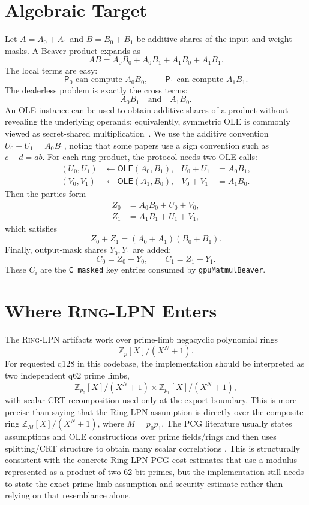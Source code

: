 \documentclass[11pt]{article}
\newcommand{\Z}{\mathbb{Z}}
\newcommand{\ServerZero}{\mathsf{P}_0}
\newcommand{\ServerOne}{\mathsf{P}_1}
\newcommand{\PrimeRing}{\Z_p[X]/(X^N+1)}
\newcommand{\LimbRing}[1]{\Z_{p_{#1}}[X]/(X^N+1)}
\newcommand{\CRTRing}{\LimbRing{0} \times \LimbRing{1}}
\newcommand{\RingLPN}{\textsc{Ring-LPN}}
\newcommand{\OLE}{\mathsf{OLE}}
\begin{document}
\section{Algebraic Target}

Let \(A=A_0+A_1\) and \(B=B_0+B_1\) be additive shares of the input and weight
masks. A Beaver product expands as
\[
  AB =
  A_0B_0 + A_0B_1 + A_1B_0 + A_1B_1 .
\]
The local terms are easy:
\[
  \ServerZero \text{ can compute } A_0B_0,\qquad
  \ServerOne \text{ can compute } A_1B_1.
\]
The dealerless problem is exactly the cross terms:
\[
  A_0B_1 \quad \text{and} \quad A_1B_0.
\]
An OLE instance can be used to obtain additive shares of a product without
revealing the underlying operands; equivalently, symmetric OLE is commonly
viewed as secret-shared multiplication~\cite{baum2020ole}. We use the additive
convention \(U_0+U_1=A_0B_1\), noting that some papers use a sign convention
such as \(c-d=ab\). For each ring product, the protocol needs two OLE calls:
\[
\begin{aligned}
  (U_0,U_1) &\leftarrow \OLE(A_0,B_1), &
  U_0+U_1 &= A_0B_1,\\
  (V_0,V_1) &\leftarrow \OLE(A_1,B_0), &
  V_0+V_1 &= A_1B_0.
\end{aligned}
\]
Then the parties form
\[
\begin{aligned}
  Z_0 &= A_0B_0 + U_0 + V_0,\\
  Z_1 &= A_1B_1 + U_1 + V_1,
\end{aligned}
\]
which satisfies
\[
  Z_0+Z_1 = (A_0+A_1)(B_0+B_1).
\]
Finally, output-mask shares \(Y_0,Y_1\) are added:
\[
  C_0 = Z_0 + Y_0,\qquad C_1 = Z_1 + Y_1.
\]
These \(C_i\) are the \texttt{C\_masked} key entries consumed by
\texttt{gpuMatmulBeaver}.

\section{Where \RingLPN{} Enters}

The \RingLPN{} artifacts work over prime-limb negacyclic polynomial rings
\[
  \PrimeRing .
\]
For requested q128 in this codebase, the implementation should be interpreted
as two independent q62 prime limbs,
\[
  \CRTRing,
\]
with scalar CRT recomposition used only at the export boundary. This is more
precise than saying that the Ring-LPN assumption is directly over the
composite ring \(\Z_M[X]/(X^N+1)\), where \(M=p_0p_1\). The PCG literature
usually states assumptions and OLE constructions over prime fields/rings and
then uses splitting/CRT structure to obtain many scalar correlations
\cite{boyle2022ringlpn}.
This is structurally consistent with the concrete Ring-LPN PCG cost estimates
that use a modulus represented as a product of two 62-bit primes, but the
implementation still needs to state the exact prime-limb assumption and
security estimate rather than relying on that resemblance alone.
\end{document}
